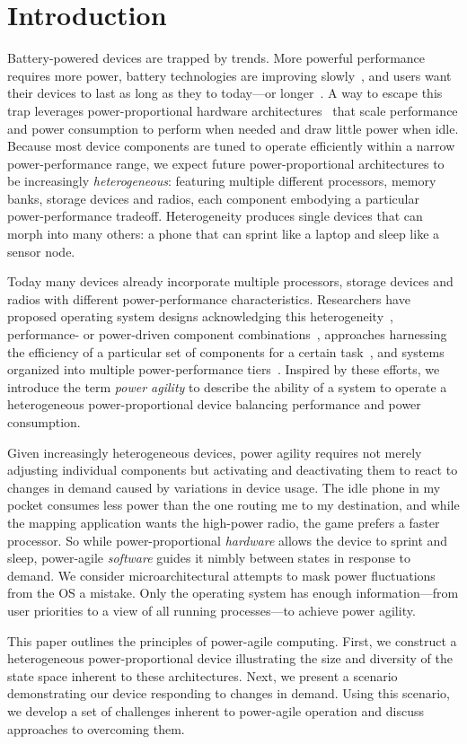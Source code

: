 \section{Introduction}

Battery-powered devices are trapped by trends. More powerful performance
requires more power, battery technologies are improving
slowly~\cite{economist-batteryhistory}, and users want their devices to last
as long as they to today---or longer~\cite{informationweek-batteries}. A way
to escape this trap leverages power-proportional hardware
architectures~\cite{barroso-energyproportional} that scale performance and
power consumption to perform when needed and draw little power when idle.
Because most device components are tuned to operate efficiently within a
narrow power-performance range, we expect future power-proportional
architectures to be increasingly \textit{heterogeneous}: featuring multiple
different processors, memory banks, storage devices and radios, each
component embodying a particular power-performance tradeoff. Heterogeneity
produces single devices that can morph into many others: a phone that can
sprint like a laptop and sleep like a sensor node.

Today many devices already incorporate multiple processors, storage devices
and radios with different power-performance characteristics. Researchers have
proposed operating system designs acknowledging this
heterogeneity~\cite{baumann-barrelfish}, performance- or power-driven
component combinations~\cite{mogul-hybridnvmdram,aruna-3Gwifi}, approaches
harnessing the efficiency of a particular set of components for a certain
task~\cite{andersen-fawn,szalay-amdahl}, and systems organized into multiple
power-performance tiers~\cite{sorber-turducken}. Inspired by these efforts,
we introduce the term \textit{power agility} to describe the ability of a
system to operate a heterogeneous power-proportional device balancing
performance and power consumption.

Given increasingly heterogeneous devices, power agility requires not merely
adjusting individual components but activating and deactivating them to react
to changes in demand caused by variations in device usage. The idle phone in
my pocket consumes less power than the one routing me to my destination, and
while the mapping application wants the high-power radio, the game prefers a
faster processor. So while power-proportional \textit{hardware} allows the
device to sprint and sleep, power-agile \textit{software} guides it nimbly
between states in response to demand. We consider microarchitectural attempts
to mask power fluctuations~\cite{rangan-hpca11} from the OS a mistake. Only
the operating system has enough information---from user priorities to a view
of all running processes---to achieve power agility.

This paper outlines the principles of power-agile computing. First, we
construct a heterogeneous power-proportional device illustrating the size and
diversity of the state space inherent to these architectures. Next, we
present a scenario demonstrating our device responding to changes in demand.
Using this scenario, we develop a set of challenges inherent to power-agile
operation and discuss approaches to overcoming them.
